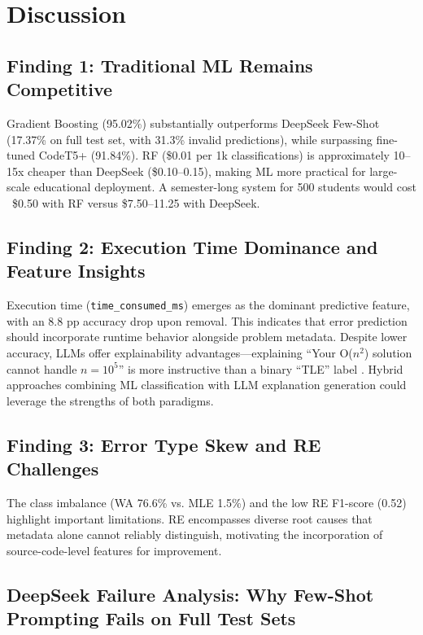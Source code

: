 \documentclass[10pt,a4paper]{article}
\begin{document}
\section{Discussion}

\subsection{Finding 1: Traditional ML Remains Competitive}

Gradient Boosting (95.02\%) substantially outperforms DeepSeek Few-Shot (17.37\% on full test set, with 31.3\% invalid predictions), while surpassing fine-tuned CodeT5+ (91.84\%). RF (\$0.01 per 1k classifications) is approximately 10--15x cheaper than DeepSeek (\$0.10--0.15), making ML more practical for large-scale educational deployment. A semester-long system for 500 students would cost ~\$0.50 with RF versus \$7.50--11.25 with DeepSeek.

\subsection{Finding 2: Execution Time Dominance and Feature Insights}

Execution time (\texttt{time\_consumed\_ms}) emerges as the dominant predictive feature, with an 8.8 pp accuracy drop upon removal. This indicates that error prediction should incorporate runtime behavior alongside problem metadata. Despite lower accuracy, LLMs offer explainability advantages---explaining ``Your O($n^2$) solution cannot handle $n = 10^5$'' is more instructive than a binary ``TLE'' label \cite{finnie2022robots}. Hybrid approaches combining ML classification with LLM explanation generation could leverage the strengths of both paradigms.

\subsection{Finding 3: Error Type Skew and RE Challenges}

The class imbalance (WA 76.6\% vs. MLE 1.5\%) and the low RE F1-score (0.52) highlight important limitations. RE encompasses diverse root causes that metadata alone cannot reliably distinguish, motivating the incorporation of source-code-level features for improvement.

\subsection{DeepSeek Failure Analysis: Why Few-Shot Prompting Fails on Full Test Sets}
\end{document}
